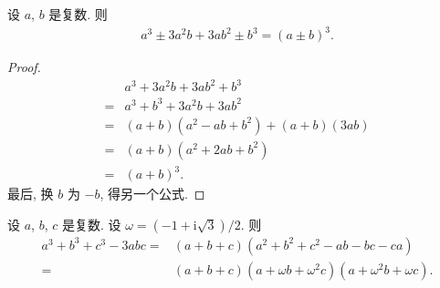 \documentclass[../libro.tex]{subfiles}
\begin{document}
\begin{theorem}
    设 \(a\), \(b\) 是复数.
    则
    \begin{align*}
        a^3 \pm 3a^2 b + 3ab^2 \pm b^3 = (a \pm b)^3.
    \end{align*}
\end{theorem}

\begin{proof}
    \begin{align*}
        {}   & a^3 + 3a^2 b + 3ab^2 + b^3             \\
        = {} & a^3 + b^3 + 3a^2 b + 3ab^2             \\
        = {} & (a + b)(a^2 - ab + b^2) + (a + b)(3ab) \\
        = {} & (a + b)(a^2 + 2ab + b^2)               \\
        = {} & (a + b)^3.
    \end{align*}
    最后, 换 \(b\) 为 \(-b\),
    得另一个公式.
\end{proof}

\begin{theorem}
    设 \(a\), \(b\), \(c\) 是复数.
    设 \(\omega = (-1 + \mathrm{i} \sqrt{3})/2\).
    则
    \begin{align*}
        a^3 + b^3 + c^3 - 3abc
        = {} & (a + b + c)(a^2 + b^2 + c^2 - ab - bc - ca) \\
        = {} & (a + b + c)(a + \omega b + \omega^2 c)
        (a + \omega^2 b + \omega c).
    \end{align*}
\end{theorem}
\end{document}
